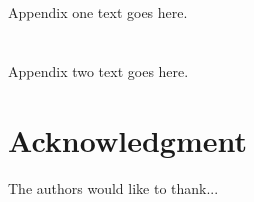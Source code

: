\documentclass[journal]{IEEEtran}
\begin{document}
\appendices
\section{}
Appendix one text goes here.

\section{}
Appendix two text goes here.


\section*{Acknowledgment}


The authors would like to thank...


\ifCLASSOPTIONcaptionsoff
  \newpage
\fi





%
%
%



% 
\end{document}
